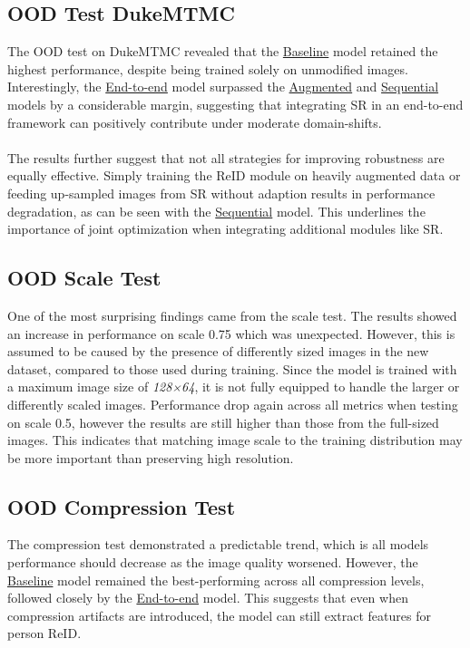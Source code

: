\subsection{OOD Test DukeMTMC}

The \acs{OOD} test on \acs{DukeMTMC} revealed that the \hyperlink{model:baseline}{Baseline} model retained the highest performance, despite being trained solely on unmodified images. Interestingly, the \hyperlink{model:endtoend}{End-to-end} model surpassed the \hyperlink{model:augmented}{Augmented} and \hyperlink{model:sequential}{Sequential} models by a considerable margin, suggesting that integrating \acs{SR} in an end-to-end framework can positively contribute under moderate domain-shifts. 
\\\\
The results further suggest that not all strategies for improving robustness are equally effective. Simply training the \acs{ReID} module on heavily augmented data or feeding up-sampled images from \acs{SR} without adaption results in performance degradation, as can be seen with the \hyperlink{model:sequential}{Sequential} model. This underlines the importance of joint optimization when integrating additional modules like \acs{SR}. 



\subsection{OOD Scale Test}

One of the most surprising findings came from the scale test. The results showed an increase in performance on scale 0.75 which was unexpected. However, this is assumed to be caused by the presence of differently sized images in the new dataset, compared to those used during training. Since the model is trained with a maximum image size of \textit{128×64}, it is not fully equipped to handle the larger or differently scaled images. Performance drop again across all metrics when testing on scale 0.5, however the results are still higher than those from the full-sized images. This indicates that matching image scale to the training distribution may be more important than preserving high resolution.

\subsection{OOD Compression Test}

The compression test demonstrated a predictable trend, which is all models performance should decrease as the image quality worsened. However, the \hyperlink{model:baseline}{Baseline} model remained the best-performing across all compression levels, followed closely by the \hyperlink{model:endtoend}{End-to-end} model. This suggests that even when compression artifacts are introduced, the model can still extract features for person \acs{ReID}. 

